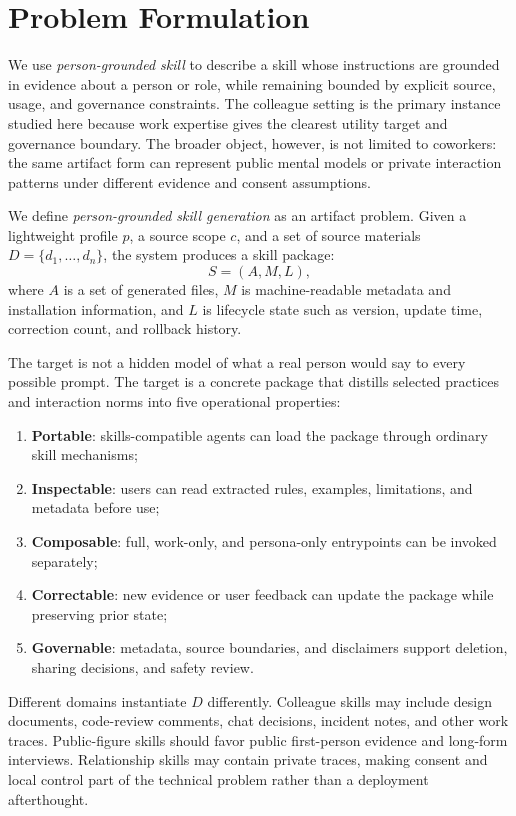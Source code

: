 \documentclass{article}
\begin{document}
\section{Problem Formulation}

We use \emph{person-grounded skill} to describe a skill whose instructions are grounded in evidence about a person or role, while remaining bounded by explicit source, usage, and governance constraints. The colleague setting is the primary instance studied here because work expertise gives the clearest utility target and governance boundary. The broader object, however, is not limited to coworkers: the same artifact form can represent public mental models or private interaction patterns under different evidence and consent assumptions.

We define \emph{person-grounded skill generation} as an artifact problem. Given a lightweight profile $p$, a source scope $c$, and a set of source materials $D=\{d_1,\ldots,d_n\}$, the system produces a skill package:
\[
S = (A, M, L),
\]
where $A$ is a set of generated files, $M$ is machine-readable metadata and installation information, and $L$ is lifecycle state such as version, update time, correction count, and rollback history.

The target is not a hidden model of what a real person would say to every possible prompt. The target is a concrete package that distills selected practices and interaction norms into five operational properties:
\begin{enumerate}
  \item \textbf{Portable}: skills-compatible agents can load the package through ordinary skill mechanisms;
  \item \textbf{Inspectable}: users can read extracted rules, examples, limitations, and metadata before use;
  \item \textbf{Composable}: full, work-only, and persona-only entrypoints can be invoked separately;
  \item \textbf{Correctable}: new evidence or user feedback can update the package while preserving prior state;
  \item \textbf{Governable}: metadata, source boundaries, and disclaimers support deletion, sharing decisions, and safety review.
\end{enumerate}

Different domains instantiate $D$ differently. Colleague skills may include design documents, code-review comments, chat decisions, incident notes, and other work traces. Public-figure skills should favor public first-person evidence and long-form interviews. Relationship skills may contain private traces, making consent and local control part of the technical problem rather than a deployment afterthought.
\end{document}
